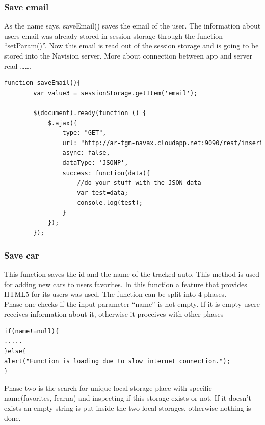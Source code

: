 \subsubsection{Save email}
As the name says, saveEmail() saves the email of the user. The information about users email was already stored in session storage through the function “setParam()”. Now this email is read out of the session storage and is going to be stored into the Navision server. More about connection between app and server read …….
\\

\begin{lstlisting}[language=html, caption= 
start timer function,captionpos=b]
function saveEmail(){    
        var value3 = sessionStorage.getItem('email');
        
        $(document).ready(function () {
            $.ajax({
                type: "GET",
                url: "http://ar-tgm-navax.cloudapp.net:9090/rest/insertAndroidEmail/"+value3+"/ac73f229f1fb88a8719e5f6d295bee45?callback=?",
                async: false,
                dataType: 'JSONP',
                success: function(data){
                    //do your stuff with the JSON data
                    var test=data;
                    console.log(test);
                }
            });
        });

\end{lstlisting}

\subsubsection{Save car}
This function saves the id and the name of the tracked auto. This method is used for adding new cars to users favorites.  In this function a feature that provides HTML5 for its users was used. The function can be split into 4 phases.
\\

Phase one checks if the input parameter “name” is not empty. If it is empty usere receives information about it, otherwise it proceives with other phases

\begin{lstlisting}[language=html, caption= 
start timer function,captionpos=b]
if(name!=null){
.....
}else{
alert("Function is loading due to slow internet connection.");
}
\end{lstlisting}

Phase two is the search for unique local storage place with specific name(favorites, fcarna) and inspecting if this storage exists or not. If it doesn’t exists an empty string is put inside the two local storages, otherwise nothing is done.
\\

